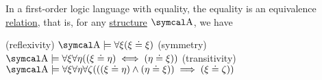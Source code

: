 \begin{proposition}\label{thm:first_order_equality_is_equivalence_relation}
  In a first-order logic language with equality, the equality is an equivalence \hyperref[def:equivalence_relation]{relation}, that is, for any \hyperref[def:first_order_structure]{structure} \( \CA \), we have
  \begin{description}
    (reflexivity) \( \CA \models \forall \xi (\xi \doteq \xi) \)
    (symmetry) \( \CA \models \forall \xi \forall \eta ((\xi \doteq \eta) \iff (\eta \doteq \xi)) \)
    (transitivity) \( \CA \models \forall \xi \forall \eta \forall \zeta (((\xi \doteq \eta) \land (\eta \doteq \xi)) \implies (\xi \doteq \zeta)) \)
  \end{description}
\end{proposition}

